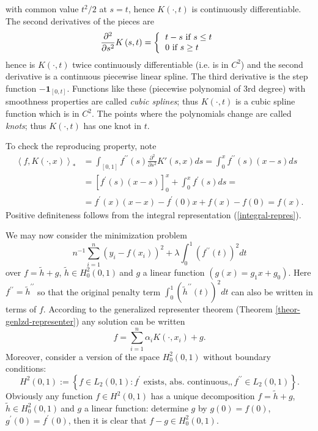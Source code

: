 \documentclass[11pt,twoside]{article}%
\theoremstyle{change}
\begin{document}
with common value $t^{2}/2$ at $s=t$, hence $K\left(  \cdot,t\right)  $ is
continuously differentiable. The second derivatives of the pieces are%
\[
\frac{\partial^{2}}{\partial s^{2}}K\left(  s,t\right)  =\left\{
\begin{tabular}
[c]{l}%
$t-s$ if $s\leq t$\\
$0$ if $s\geq t$%
\end{tabular}
\right.
\]
hence is $K\left(  \cdot,t\right)  $ twice continuously differentiable (i.e.
is in $C^{2}$) and the second derivative is a continuous piecewise linear
spline. The third derivative is the step function $-\mathbf{1}_{[0,t]}$.
Functions like these (piecewise polynomial of 3rd degree) with smoothness
properties are called \textit{cubic splines}; thus $K\left(  \cdot,t\right)  $
is a cubic spline function which is in $C^{2}$. The points where the
polynomials change are called \textit{knots}; thus $K\left(  \cdot,t\right)  $
has one knot in $t.$

To check the reproducing property, note
\begin{align*}
\left\langle f,K\left(  \cdot,x\right)  \right\rangle _{\ast}  & =\int
_{[0,1]}f^{\prime\prime}(s)\frac{\partial^{2}}{\partial s^{2}}K\prime\left(
s,x\right)  ds=\int_{0}^{x}f^{\prime\prime}(s)\left(  x-s\right)  ds\\
& =\left[  f^{\prime}(s)\left(  x-s\right)  \right]  _{0}^{x}+\int_{0}%
^{x}f^{\prime}(s)ds=\\
& =f^{\prime}(x)\left(  x-x\right)  -f^{\prime}(0)x+f(x)-f(0)=f(x).
\end{align*}
Positive definiteness follows from the integral representation
(\ref{integral-repres}).

We may now consider the minimization problem
\[
n^{-1}\sum_{i=1}^{n}(y_{i}-f(x_{i}))^{2}+\lambda\int_{0}^{1}\left(
f^{\prime\prime}(t)\right)  ^{2}dt
\]
over $f=\tilde{h}+g$, $\tilde{h}\in H_{0}^{2}(0,1)\mathcal{\ }$and $g$ a
linear function $\left(  g(x)=g_{1}x+g_{0}\right)  .$ Here $f^{\prime\prime
}=\tilde{h}^{\prime\prime}$ so that the original penalty term $\int_{0}%
^{1}\left(  \tilde{h}^{\prime\prime}(t)\right)  ^{2}dt$ can also be written in
terms of $f.$ According to the generalized representer theorem (Theorem
\ref{theor-genlzd-representer}) any solution can be written
\[
f=\sum_{i=1}^{n}\alpha_{i}K\left(  \cdot,x_{i}\right)  +g.
\]
Moreover, consider a version of the space $H_{0}^{2}(0,1)$ without boundary
conditions:
\[
H^{2}(0,1):=\left\{  f\in L_{2}(0,1):f^{\prime}\text{ exists, abs. continuous,
},f^{\prime\prime}\in L_{2}(0,1)\right\}  .
\]
Obviously any function $f\in H^{2}(0,1)$ has a unique decomposition
$f=\tilde{h}+g$, $\tilde{h}\in H_{0}^{2}(0,1)\mathcal{\ }$and $g$ a linear
function: determine $g$ by $g(0)=f(0)$, $g^{\prime}(0)=f^{\prime}(0)$, then it
is clear that $f-g\in H_{0}^{2}(0,1)$.
\end{document}
